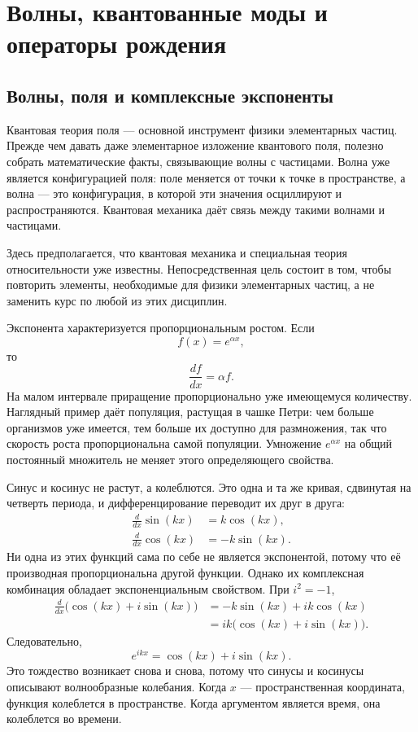 \chapter{Волны, квантованные моды и операторы рождения}

\section{Волны, поля и комплексные экспоненты}

Квантовая теория поля — основной инструмент физики элементарных частиц. Прежде чем давать даже элементарное изложение квантового поля, полезно собрать математические факты, связывающие волны с частицами. Волна уже является конфигурацией поля: поле меняется от точки к точке в пространстве, а волна — это конфигурация, в которой эти значения осциллируют и распространяются. Квантовая механика даёт связь между такими волнами и частицами.

Здесь предполагается, что квантовая механика и специальная теория относительности уже известны. Непосредственная цель состоит в том, чтобы повторить элементы, необходимые для физики элементарных частиц, а не заменить курс по любой из этих дисциплин.

Экспонента характеризуется пропорциональным ростом. Если
\begin{equation}
f(x)=e^{\alpha x},
\end{equation}
то
\begin{equation}
\frac{df}{dx}=\alpha f.
\end{equation}
На малом интервале приращение пропорционально уже имеющемуся количеству. Наглядный пример даёт популяция, растущая в чашке Петри: чем больше организмов уже имеется, тем больше их доступно для размножения, так что скорость роста пропорциональна самой популяции. Умножение \(e^{\alpha x}\) на общий постоянный множитель не меняет этого определяющего свойства.

Синус и косинус не растут, а колеблются. Это одна и та же кривая, сдвинутая на четверть периода, и дифференцирование переводит их друг в друга:
\begin{align}
\frac{d}{dx}\sin(kx)&=k\cos(kx),\\
\frac{d}{dx}\cos(kx)&=-k\sin(kx).
\end{align}
Ни одна из этих функций сама по себе не является экспонентой, потому что её производная пропорциональна другой функции. Однако их комплексная комбинация обладает экспоненциальным свойством. При \(i^2=-1\),
\begin{align}
\frac{d}{dx}\bigl(\cos(kx)+i\sin(kx)\bigr)
&=-k\sin(kx)+ik\cos(kx)\\
&=ik\bigl(\cos(kx)+i\sin(kx)\bigr).
\end{align}
Следовательно,
\begin{equation}
e^{ikx}=\cos(kx)+i\sin(kx).
\end{equation}
Это тождество возникает снова и снова, потому что синусы и косинусы описывают волнообразные колебания. Когда \(x\) — пространственная координата, функция колеблется в пространстве. Когда аргументом является время, она колеблется во времени.

